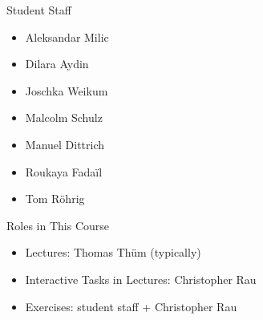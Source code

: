 \begin{frame}{\insertsubsection}
	\begin{fancycolumns}
		\begin{definition}{Student Staff}
			\begin{itemize}
				\item Aleksandar Milic
				\item Dilara Aydin
				\item Joschka Weikum
				\item Malcolm Schulz
				\item Manuel Dittrich
				\item Roukaya Fada\"il
				\item Tom Röhrig
			\end{itemize}
		\end{definition}
	\nextcolumn
		\begin{note}{Roles in This Course}
			\begin{itemize}
				\item Lectures: Thomas Thüm (typically)
				\item Interactive Tasks in Lectures: Christopher Rau
				\item Exercises: student staff + Christopher Rau
			\end{itemize}
		\end{note}
	\end{fancycolumns}
\end{frame}
